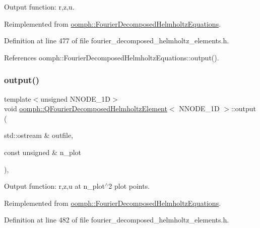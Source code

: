 Output function\+: r,z,u. 



Reimplemented from \hyperlink{classoomph_1_1FourierDecomposedHelmholtzEquations_aaa7d646147698753b363fe2f5adadeb1}{oomph\+::\+Fourier\+Decomposed\+Helmholtz\+Equations}.



Definition at line 477 of file fourier\+\_\+decomposed\+\_\+helmholtz\+\_\+elements.\+h.



References oomph\+::\+Fourier\+Decomposed\+Helmholtz\+Equations\+::output().

\mbox{\label{classoomph_1_1QFourierDecomposedHelmholtzElement_aa14e9dc5f9773a5b043ea7873a7b9790}} 
\subsubsection{\texorpdfstring{output()}{output()}\hspace{0.1cm}{\footnotesize\ttfamily [2/4]}}
{\footnotesize\ttfamily template$<$unsigned N\+N\+O\+D\+E\+\_\+1D$>$ \\
void \hyperlink{classoomph_1_1QFourierDecomposedHelmholtzElement}{oomph\+::\+Q\+Fourier\+Decomposed\+Helmholtz\+Element}$<$ N\+N\+O\+D\+E\+\_\+1D $>$\+::output (\begin{DoxyParamCaption}\item[{std\+::ostream \&}]{outfile,  }\item[{const unsigned \&}]{n\+\_\+plot }\end{DoxyParamCaption})\hspace{0.3cm}{\ttfamily [inline]}, {\ttfamily [virtual]}}



Output function\+: r,z,u at n\+\_\+plot$^\wedge$2 plot points. 



Reimplemented from \hyperlink{classoomph_1_1FourierDecomposedHelmholtzEquations_a19e2628564b587b97db37c9a4820be60}{oomph\+::\+Fourier\+Decomposed\+Helmholtz\+Equations}.



Definition at line 482 of file fourier\+\_\+decomposed\+\_\+helmholtz\+\_\+elements.\+h.



